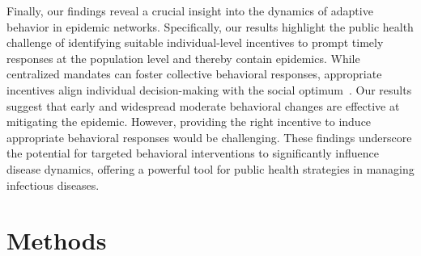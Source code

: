 \documentclass[9pt,twocolumn,twoside]{pnas-new}
\begin{document}

Finally, our findings reveal a crucial insight into the dynamics of adaptive behavior in epidemic networks. Specifically, our results highlight the public health challenge of identifying suitable individual-level incentives to prompt timely responses at the population level and thereby contain epidemics.
%
While centralized mandates can foster collective behavioral responses, appropriate incentives align individual decision-making with the social optimum~\cite{Traulsen23,crabtree2024influential}.
%
Our results suggest that early and widespread moderate behavioral changes are effective at mitigating the epidemic. However, providing the right incentive to induce appropriate behavioral responses would be challenging.
These findings underscore the potential for targeted behavioral interventions to significantly influence disease dynamics, offering a powerful tool for public health strategies in managing infectious diseases.


\section*{Methods}
\end{document}
